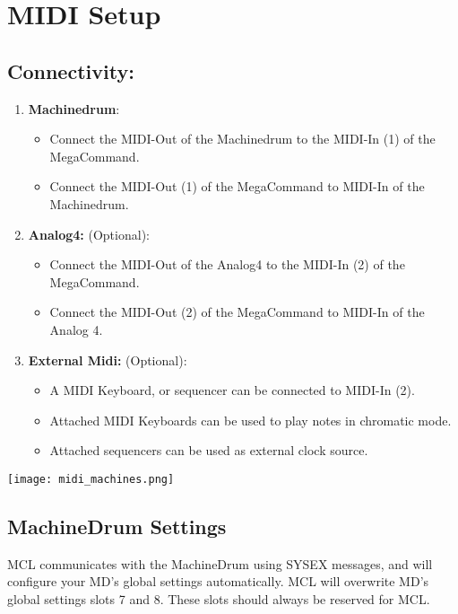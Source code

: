 \chapter{MIDI Setup}
\section{Connectivity:}

\begin{enumerate}
\item\textbf{Machinedrum}:
\begin{itemize}
    \item Connect the MIDI-Out of the Machinedrum to the MIDI-In (1) of the MegaCommand.
    \item Connect the MIDI-Out (1) of the MegaCommand to MIDI-In of the Machinedrum.
\end{itemize}

\item\textbf{Analog4:} (Optional):
\begin{itemize}
    \item Connect the MIDI-Out of the Analog4 to the MIDI-In (2) of the MegaCommand. 
    \item Connect the MIDI-Out (2) of the MegaCommand to MIDI-In of the Analog 4.
\end{itemize}

\item\textbf{External Midi:} (Optional): 
\begin{itemize}
    \item A MIDI Keyboard, or sequencer can be connected to MIDI-In (2). 
    \item Attached MIDI Keyboards can be used to play notes in chromatic mode.
    \item Attached sequencers can be used as external clock source.
\end{itemize}

\end{enumerate}
\texttt{[image: midi\_machines.png]}
\\
\newpage
\section{MachineDrum Settings }

MCL communicates with the MachineDrum using SYSEX messages, and will configure your MD's global settings automatically. MCL will overwrite MD's global settings slots 7 and 8. These slots should always be reserved for MCL.

